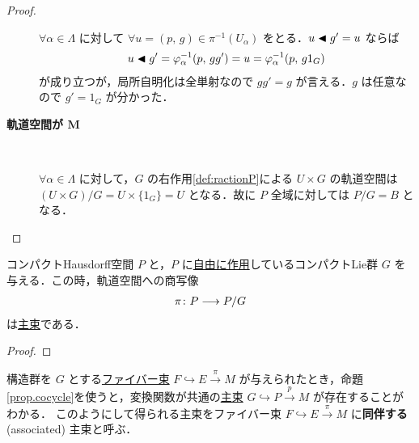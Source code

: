 \documentclass[geometry_main]{subfiles}
\begin{document}
\begin{proof}
\begin{description}
            $\forall \alpha \in \Lambda$ に対して
            $\forall u = (p,\, g) \in \pi^{-1}(U_\alpha)$ をとる．$u \blacktriangleleft g' = u$ ならば
            \begin{align}
                u \blacktriangleleft g' = \varphi_\alpha^{-1} (p,\, gg') = u = \varphi_\alpha^{-1}(p,\, g 1_G)
            \end{align}
            が成り立つが，局所自明化は全単射なので $gg' = g$ が言える．$g$ は任意なので $g' = 1_G$ が分かった．
        \item[\textbf{軌道空間が $\bm{M}$}]　 
        
            $\forall \alpha \in \Lambda$ に対して，$G$ の右作用\eqref{def:ractionP}による $U \times G$ の軌道空間は $(U \times G) / G = U \times \{1_G\} = U$ となる．故に $P$ 全域に対しては $P/G = B$ となる．
	\end{description}
\end{proof}

\begin{mytheo}[label=thm:principal]{}
    コンパクトHausdorff空間 $P$ と，$P$ に\hyperref[def:Lie-action]{自由に作用}しているコンパクトLie群 $G$ を与える．この時，軌道空間への商写像
    \begin{align}
        \pi \colon P \longrightarrow P/G
    \end{align}
    は\hyperref[def.PFD]{主束}である．
\end{mytheo}

\begin{proof}
    
\end{proof}

構造群を $G$ とする\hyperref[def.fiber-1]{ファイバー束} $F \hookrightarrow E \xrightarrow{\pi} M$ が与えられたとき，命題\ref{prop.cocycle}を使うと，変換関数が共通の\hyperref[def.PFD]{主束} $G \hookrightarrow P \xrightarrow{p} M$ が存在することがわかる．
このようにして得られる主束をファイバー束 $F \hookrightarrow E \xrightarrow{\pi} M$ に\textbf{同伴する} (associated) 主束と呼ぶ．
\end{document}
